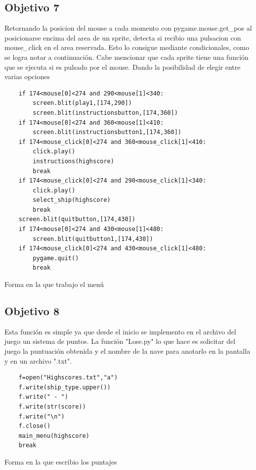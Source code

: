 \documentclass[12pt,letterpaper]{article}
\begin{document}
\subsection{Objetivo 7} \label{objetivo7} 
Retornando la posicion del mouse a cada momento con pygame.mouse.get\_pos\(\) al posicionarse encima del area de un sprite, detecta si recibio una pulsacion con mouse\_click en el area reservada. Esto lo consigue mediante condicionales, como se logra notar a continuación. Cabe mencionar que cada sprite tiene una función que se ejecuta si es pulsado por el mouse. Dando la posibilidad de elegir entre varias opciones

\begin{listing}[H]
\begin{verbatim}
    if 174<mouse[0]<274 and 290<mouse[1]<340:
        screen.blit(play1,[174,290])
        screen.blit(instructionsbutton,[174,360])
    if 174<mouse[0]<274 and 360<mouse[1]<410:
        screen.blit(instructionsbutton1,[174,360])
    if 174<mouse_click[0]<274 and 360<mouse_click[1]<410:
        click.play()
        instructions(highscore)
        break
    if 174<mouse_click[0]<274 and 290<mouse_click[1]<340:
        click.play()
        select_ship(highscore)
        break
    screen.blit(quitbutton,[174,430])
    if 174<mouse[0]<274 and 430<mouse[1]<480:
        screen.blit(quitbutton1,[174,430])
    if 174<mouse_click[0]<274 and 430<mouse_click[1]<480:
        pygame.quit()
        break
\end{verbatim}
\caption{Forma en la que trabajo el menú}


\label{menu}
\end{listing}






\subsection{Objetivo 8} \label{objetivo8}
Esta función es simple ya que desde el inicio se implemento en el archivo del juego un sistema de puntos. La función "Lose.py" lo que hace es solicitar del juego la puntuación obtenida y el nombre de la nave para anotarlo en la pantalla y en un archivo ".txt".


\begin{listing}[H]
\begin{verbatim}
    f=open("Highscores.txt","a")
    f.write(ship_type.upper())
    f.write(" - ")
    f.write(str(score))
    f.write("\n")
    f.close()
    main_menu(highscore)
    break
\end{verbatim}
\caption{Forma en la que escribio los puntajes}


\label{menu}
\end{listing}
\newpage
\end{document}
